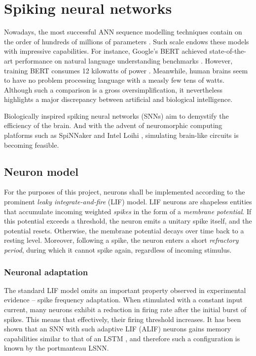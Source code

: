 \documentclass[../../report.tex]{subfiles}
\begin{document}
\section{Spiking neural networks}

Nowadays, the most successful ANN sequence modelling techniques contain on the
order of hundreds of millions of parameters \cite{Bender2021}. Such scale endows
these models with impressive capabilities. For instance, Google's BERT achieved
state-of-the-art performance on natural language understanding benchmarks
\cite{Devlin2019}. However, training BERT consumes 12 kilowatts of power
\cite{Strubell2019}. Meanwhile, human brains seem to have no problem processing
language with a measly few tens of watts. Although such a comparison is a gross
oversimplification, it nevertheless highlights a major discrepancy between
artificial and biological intelligence.

Biologically inspired spiking neural networks (SNNs) aim to demystify the
efficiency of the brain. And with the advent of neuromorphic computing platforms
such as SpiNNaker \cite{Furber2014} and Intel Loihi \cite{Davies2018},
simulating brain-like circuits is becoming feasible.

\subsection{Neuron model}

For the purposes of this project, neurons shall be implemented according to the
prominent \emph{leaky integrate-and-fire} (LIF) model. LIF neurons are shapeless
entities that accumulate incoming weighted \emph{spikes} in the form of a
\emph{membrane potential}. If this potential exceeds a threshold, the neuron
emits a unitary spike itself, and the potential resets. Otherwise, the membrane
potential decays over time back to a resting level. Moreover, following a spike,
the neuron enters a short \emph{refractory period}, during which it cannot spike
again, regardless of incoming stimulus.

\subsubsection{Neuronal adaptation}
The standard LIF model omits an important property observed in experimental
evidence -- spike frequency adaptation. When stimulated with a constant input
current, many neurons exhibit a reduction in firing rate after the initial burst
of spikes. This means that effectively, their firing threshold increases. It has
been shown that an SNN with such adaptive LIF (ALIF) neurons gains memory
capabilities similar to that of an LSTM \cite{Bellec2018LSNN}, and therefore
such a configuration is known by the portmanteau LSNN.
\end{document}
